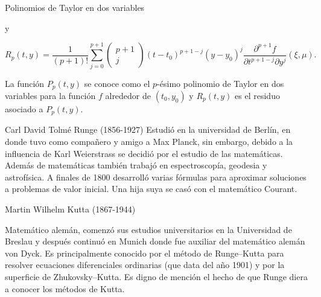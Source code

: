 \documentclass{beamer}
\begin{document}
\begin{frame}{Polinomios de Taylor en dos variables}

{\footnotesize 
\begin{block}{}
y

\begin{displaymath}
R_p(t,y) = \dfrac{1}{(p+1)!} \sum\limits_{j = 0}^{p+1} \left( \begin{matrix}p+1 \\ j \end{matrix}\right) (t-t_0)^{p+1-j}(y-y_0)^{j} \dfrac{\partial^{p+1} f}{\partial t^{p+1-j} \partial y^j}(\xi, \mu).
\end{displaymath}

\end{block}

La función $P_p(t,y)$ se conoce como el $p$-ésimo polinomio de Taylor en dos variables para la función $f$ alrededor de $(t_0, y_0)$ y $R_p(t,y)$ es el residuo asociado a $P_p(t,y)$.
}
\end{frame}

\begin{frame}{Carl David Tolmé Runge (1856-1927) }
	 Estudió en la universidad de Berlín, en donde tuvo como compañero y amigo a Max Planck, sin embargo, debido a la influencia de Karl Weierstrass se decidió por el estudio de las matemáticas. \pause Además de matemáticas también trabajó en espectroscopía, geodesia y astrofísica. A finales de 1800 desarrolló varias fórmulas para aproximar soluciones a problemas de valor inicial. \pause Una hija suya se casó con el matemático Courant.
	
\end{frame}

\begin{frame}{Martin Wilhelm Kutta (1867-1944) }

	 Matemático alemán, comenzó sus estudios universitarios en la Universidad de Breslau y después continuó en Munich donde fue auxiliar del matemático alemán von Dyck. \pause Es principalmente conocido por el método de Runge–Kutta para resolver ecuaciones diferenciales ordinarias (que data del año 1901) y por la superficie de Zhukovsky–Kutta. \pause Es digno de mención el hecho de que Runge diera a conocer los métodos de Kutta.
\end{frame}
\end{document}
